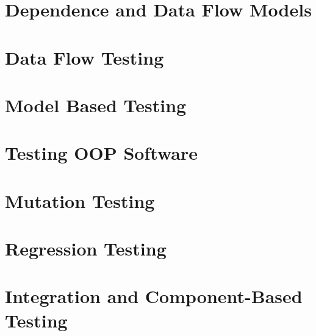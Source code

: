 \documentclass{article}
\begin{document}
\section{Dependence and Data Flow Models}

\section{Data Flow Testing}

\section{Model Based Testing}

\section{Testing OOP Software}

\section{Mutation Testing}

\section{Regression Testing}

\section{Integration and Component-Based Testing}
\end{document}

